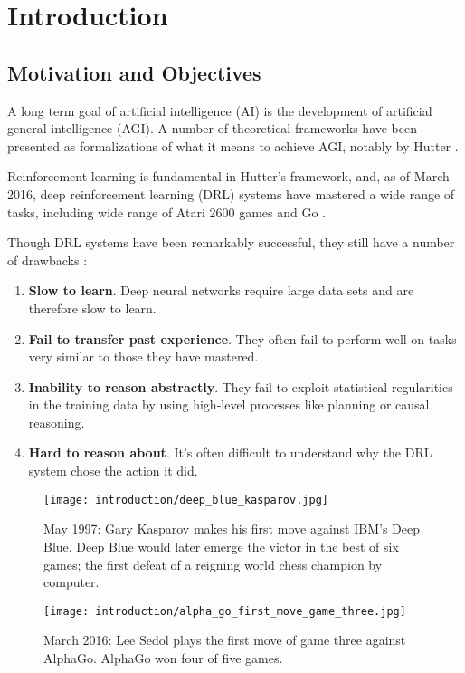 \chapter{Introduction}

\section{Motivation and Objectives}

A long term goal of artificial intelligence (AI) is the development of artificial general intelligence (AGI). 	A number of theoretical frameworks have been presented as formalizations of what it means to achieve AGI, notably by Hutter \cite{Hutter2005}.

Reinforcement learning is fundamental in Hutter's framework, and, as of March 2016, deep reinforcement learning (DRL) systems have mastered a wide range of tasks, including wide range of Atari 2600 games and Go \cite{Mnih2015, Silver2016}.

Though DRL systems have been remarkably successful, they still have a number of drawbacks \cite{Garnelo2016}:

\begin{enumerate}
\item \textbf{Slow to learn}. Deep neural networks require large data sets and are therefore
slow to learn.
\item \textbf{Fail to transfer past experience}. They often fail to perform well on tasks very
similar to those they have mastered.
\item \textbf{Inability to reason abstractly}. They fail to exploit statistical regularities in the
training data by using high-level processes like planning or causal reasoning.
\item \textbf{Hard to reason about}. It's often difficult to understand why the DRL
system chose the action it did.
\end{enumerate}

\begin{figure}[h!]
\centering
\begin{minipage}{.45\textwidth}
  \centering
\texttt{[image: introduction/deep\_blue\_kasparov.jpg]}
  \caption{May 1997: Gary Kasparov makes his first move against IBM's Deep Blue. Deep Blue would later emerge the victor in the best of six games; the first defeat of a reigning world chess champion by computer. \cite{Rosen2012}}
  \label{fig:deep_blue_kasparov}
\end{minipage}%
  \hfill
\begin{minipage}{.45\textwidth}
  \centering
\texttt{[image: introduction/alpha\_go\_first\_move\_game\_three.jpg]}
  \caption{March 2016: Lee Sedol plays the first move of game three against AlphaGo. AlphaGo won four of five games. \cite{Ormerod2016}}
  \label{fig:alpha_go_first_move_game_three}
\end{minipage}
\end{figure}


